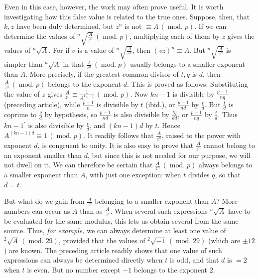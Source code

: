 Even in this case, however, the work may often prove useful. It is worth investigating how this false value is related to the true ones. Suppose, then, that $k,z$ have been duly determined, but $z^n$ is not $\equiv A\,(\operatorname{mod.}p)$. If we can determine the values of ${}^{n}\!\surd{\frac{A}{z^n}}\,(\operatorname{mod.}p)$, multiplying each of them by $z$ gives the values of ${}^{n}\!\surd{A}$. For if $v$ is a value of ${}^{n}\!\surd{\frac{A}{z^n}}$, then $(vz)^n\equiv A$. But ${}^{n}\!\surd{\frac{A}{z^n}}$ is simpler than ${}^{n}\!\surd{A}$ in that $\frac{A}{z^n}\,(\operatorname{mod.}p)$ usually belongs to a smaller exponent than $A$. More precisely, if the greatest common divisor of $t,q$ is $d$, then $\frac{A}{z^n}\,(\operatorname{mod.}p)$ belongs to the exponent $d$. This is proved as follows. Substituting the value of $z$ gives $\frac{A}{z^n}\equiv\frac{1}{A^{kn-1}}\,(\operatorname{mod.}p)$. Now $kn-1$ is divisible by $\frac{p-1}{nq}$ (preceding article), while $\frac{p-1}{n}$ is divisible by $t$ (ibid.), or $\frac{p-1}{nd}$ by $\frac{t}{d}$. But $\frac{t}{d}$ is coprime to $\frac{q}{d}$ by hypothesis, so $\frac{p-1}{nd}$ is also divisible by $\frac{tq}{dd}$, or $\frac{p-1}{nq}$ by $\frac{t}{d}$. Thus $kn-1{}^{\prime}$ is also divisible by $\frac{t}{d}$, and $(kn-1)d$ by $t$. Hence $A^{(kn-1)d}\equiv1\,(\operatorname{mod.}p)$. It readily follows that $\frac{A}{z^n}$, raised to the power with exponent $d$, is congruent to unity. It is also easy to prove that $\frac{A}{z^n}$ cannot belong to an exponent smaller than $d$, but since this is not needed for our purpose, we will not dwell on it. We can therefore be certain that $\frac{A}{z^n}\,(\operatorname{mod.}p)$ always belongs to a smaller exponent than $A$, with just one exception: when $t$ divides $q$, so that $d=t$.

But what do we gain from $\frac{A}{z^n}$ belonging to a smaller exponent than $A$? More numbers can occur as $A$ than as $\frac{A}{z^n}$. When several such expressions ${}^{n}\!\surd{A}$ have to be evaluated for the same modulus, this lets us obtain several from the same source. Thus, \emph{for example,} we can always determine at least one value of ${}^{2}\!\surd{A}\,(\operatorname{mod.}29)$,
provided that the values of ${}^{2}\!\surd{-1}\,(\operatorname{mod.}29)$ (which are $\pm12$) are known. The preceding article readily shows that one value of such expressions can always be determined directly when $t$ is odd, and that $d$ is $=2$ when $t$ is even. But no number except $-1$ belongs to the exponent $2$.

